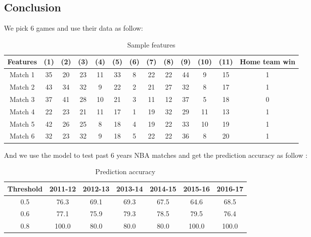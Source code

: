 \documentclass[sigconf]{acmart}
\begin{document}
\subsection{Conclusion}
We pick 6 games and use their data as follow:


 

\begin{table*}[!hbp]
\begin{tabular}{|c|c|c|c|c|c|c|c|c|c|c|c|c|}
\hline
\hline
Features & (1) & (2) & (3) & (4) & (5) & (6) & (7) & (8) & (9) & (10) & (11) & Home team win \\
\hline
Match 1 & 35 & 20 & 23 & 11 & 33 & 8& 22 & 22 & 44 & 9 & 15 & 1\\
\hline
Match 2 & 43 & 34 & 32 & 9 & 22 & 2 & 21 & 27 & 32 & 8 & 17 & 1\\
\hline
Match 3 & 37 & 41 & 28 & 10 & 21 & 3 & 11 & 12 & 37 & 5 & 18 & 0\\
\hline
Match 4 & 22 & 23 & 21 & 11 & 17 & 1 & 19 & 32 & 29 & 11 & 13 & 1\\
\hline
Match 5 & 42 & 26 & 25 & 8 & 18 & 4 & 19 & 22 & 33 & 10 & 19 & 1\\
\hline
Match 6 & 32 & 23 & 32 & 9 & 18 & 5 & 22 & 22 & 36 & 8 & 20 & 1\\
\hline
\end{tabular}
\caption{Sample features}
\label{Sample features}
\end{table*} 
And we use the model to test past 6 years NBA matches and get the prediction accuracy as follow :
\begin{table*}[htb]
    \centering
    \begin{tabular}{c|c|c|c|c|c|c}
         \hline
         Threshold & 2011-12 & 2012-13 & 2013-14 & 2014-15 & 2015-16 & 2016-17\\
         \hline
         0.5 & 76.3 & 69.1 & 69.3 & 67.5 & 64.6 & 68.5\\
         \hline
         0.6 & 77.1 & 75.9 & 79.3 & 78.5 & 79.5 & 76.4\\
         \hline 
         0.8 & 100.0 & 80.0 & 80.0 & 80.0 & 100.0 & 100.0\\
    \end{tabular}
    \caption{Prediction accuracy}
    \label{Prediction accuracy}
\end{table*}
\end{document}
